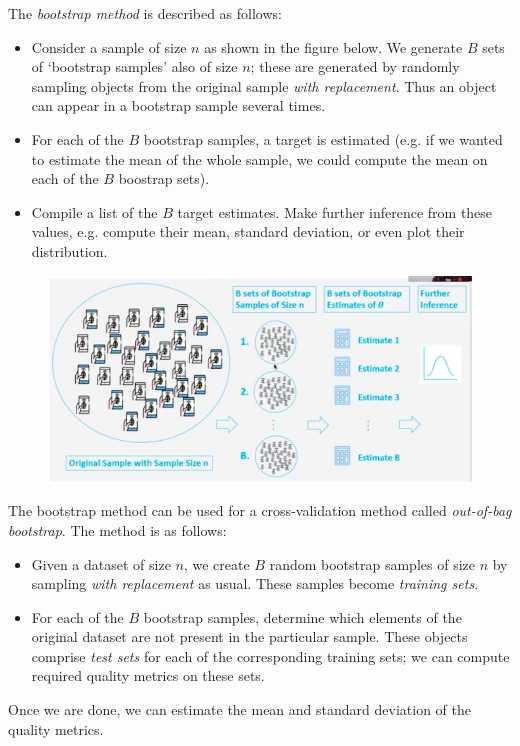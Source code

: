 The \textit{bootstrap method} is described as follows:
\begin{itemize}
\item Consider a sample of size $n$ as shown in the figure below. We generate $B$ sets of `bootstrap samples' also of size $n$; these are generated by randomly sampling objects from the original sample \textit{with replacement}. Thus an object can appear in a bootstrap sample several times.
\item For each of the $B$ bootstrap samples, a target is estimated (e.g. if we  wanted to estimate the mean of the whole sample, we could compute the mean on each of the $B$ boostrap sets).
\item Compile a list of the $B$ target estimates. Make further inference from these values, e.g. compute their mean, standard deviation, or even plot their distribution.
\end{itemize}

\begin{figure}[H]
\centering
\includegraphics[scale=0.4]{bootstrap.png}
\end{figure}



\newpage
The bootstrap method can be used for a cross-validation method called \textit{out-of-bag bootstrap}. The method is as follows:
\begin{itemize}
\item Given a dataset of size $n$, we create $B$ random bootstrap samples of size $n$ by sampling \textit{with replacement} as usual. These samples become \textit{training sets}.
\item For each of the $B$ bootstrap samples, determine which elements of the original dataset are not present in the particular sample. These objects comprise \textit{test sets} for each of the corresponding training sets; we can compute required quality metrics on these sets.
\end{itemize}
Once we are done, we can estimate the mean and standard deviation of the quality metrics.

